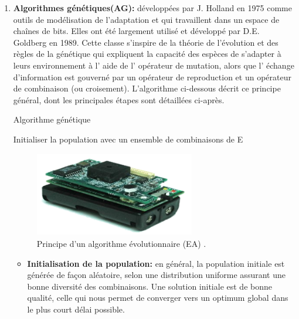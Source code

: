\begin{enumerate}[label=\alph*)]
	\item \textbf{Algorithmes génétiques(AG):} développées par J. Holland en 1975 comme outils de modélisation de l’adaptation et qui travaillent dans un espace de chaînes de bits. Elles ont été largement utilisé et développé par D.E. Goldberg en 1989. Cette classe s’inspire de la théorie de l’évolution et des règles de la génétique qui expliquent la capacité des espèces de s’adapter à leurs environnement à l’ aide de l’ opérateur de mutation, alors que l’ échange               	d’information est gouverné par un opérateur de reproduction et un opérateur de combinaison (ou croisement). L’algorithme ci-dessous décrit ce principe général, dont les principales étapes sont détaillées ci-après.

\begin{algorithm}[H]
\caption{Algorithme génétique}
\SetAlgoLined
\DontPrintSemicolon

Initialiser la population avec un ensemble de combinaisons de E \;

\end{algorithm}


\begin{figure}[h]
	\centering
	\includegraphics[width=7cm,height=3.7cm]{Chap1/1.png}
	\caption{Principe d’un algorithme évolutionnaire (EA) \cite{dreo2003metaheuristiques}.}
	\label{fig:CSF}
\end{figure}
	
\begin{itemize}
	\item \textbf{Initialisation de la population: }en général, la population initiale est générée de façon aléatoire, selon une distribution uniforme assurant une bonne diversité des combinaisons. Une solution initiale est de bonne qualité, celle qui nous permet de converger vers un optimum global dans le plus court délai possible.
	

\end{itemize}
\end{enumerate}

